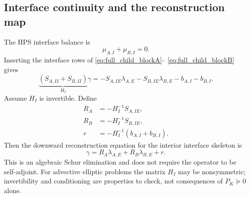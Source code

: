 \documentclass[11pt]{article}
\begin{document}
\subsection{Interface continuity and the reconstruction map}
The HPS interface balance is
\begin{equation}\label{eq:full_flux_balance}
 \mu_{A,I}+\mu_{B,I}=0.
\end{equation}
Inserting the interface rows of \eqref{eq:full_child_blockA}--
\eqref{eq:full_child_blockB} gives
\begin{equation}\label{eq:full_interface_H}
 \underbrace{(S_{A,II}+S_{B,II})}_{H_I}\gamma
 =-S_{A,IE}\lambda_{A,E}-S_{B,IE}\lambda_{B,E}
  -b_{A,I}-b_{B,I}.
\end{equation}
Assume $H_I$ is invertible.  Define
\begin{equation}\label{eq:full_RAr}
 \boxed{\begin{aligned}
 R_A&=-H_I^{-1}S_{A,IE},\\
 R_B&=-H_I^{-1}S_{B,IE},\\
 r&=-H_I^{-1}(b_{A,I}+b_{B,I}).
 \end{aligned}}
\end{equation}
Then the downward reconstruction equation for the interior interface
skeleton is
\begin{equation}\label{eq:full_gamma}
 \boxed{\gamma=R_A\lambda_{A,E}+R_B\lambda_{B,E}+r.}
\end{equation}
This is an algebraic Schur elimination and does not require the
operator to be self-adjoint.  For advective elliptic problems the
matrix $H_I$ may be nonsymmetric; invertibility and conditioning
are properties to check, not consequences of $P_K\succeq0$ alone.
\end{document}
